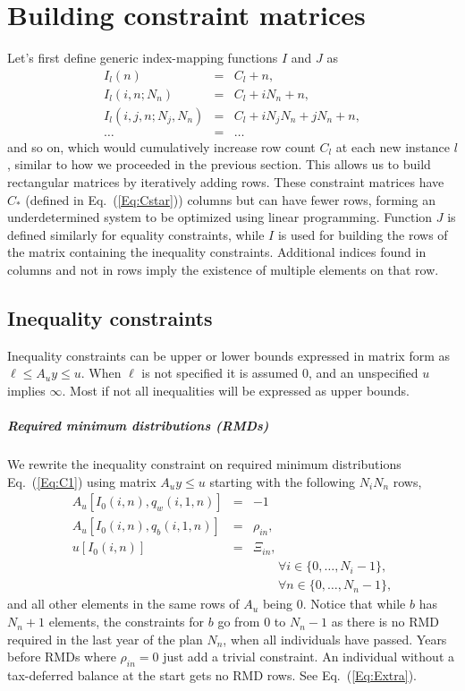 \documentclass[fleqn,12pt]{report}
\begin{document}
\chapter{Building constraint matrices}
\label{Chap:Matrices}
Let's first define generic index-mapping functions $I$ and $J$ as
\begin{eqnarray}
	\label{Eq:Offsets}
	I_l(n) &=& C_l + n, \nonumber \\
	I_l(i, n; N_n) &=& C_l + iN_n + n, \nonumber \\
	I_l(i, j, n; N_j, N_n) &=& C_l + iN_j N_n + jN_n +n, \\
	\ldots &=& \ldots \nonumber
\end{eqnarray}
and so on, which would cumulatively increase row count $C_l$ at each new instance $l$,
similar to how we proceeded in the previous section.
This allows us to build rectangular matrices by iteratively adding rows.
These constraint matrices have $C_*$ (defined in Eq.~(\ref{Eq:Cstar}))
columns but can have fewer rows,
forming an underdetermined system to be optimized using linear programming.
Function $J$ is defined similarly for equality constraints, while $I$ is used
for building the rows of the matrix containing the inequality constraints.
Additional indices found in columns and not in rows imply the existence of multiple elements on that row. 

\section{Inequality constraints}
Inequality constraints can be upper or lower bounds expressed in matrix form as
$\ell \le A_{u}y \le u$. When $\ell$ is not specified it is assumed 0, and
an unspecified $u$ implies $\infty$. Most if not all inequalities will be expressed as upper bounds.

\paragraph*{Required minimum distributions (RMDs)}
We rewrite the inequality constraint on required minimum distributions
Eq.~(\ref{Eq:C1}) using matrix $A_{u}y \le u$ starting with the following $N_iN_n$ rows, 
\begin{eqnarray}
	A_u[I_0(i, n), q_w(i, 1, n)] &=& -1 \nonumber \\
	A_u[I_0(i, n), q_b(i, 1, n)] &=& \rho_{in}, \nonumber \\
	u[I_0(i, n)] &=& \Xi_{in}, \\
	&&\qquad\forall i \in \{0,\ldots, N_i - 1\}, \nonumber\\
	&&\qquad\forall n \in \{0,\ldots, N_n - 1\},\nonumber
\end{eqnarray}
and all other elements in the same rows of $A_u$ being $0$.
Notice that while $b$ has $N_n+1$ elements, the constraints
for $b$ go from $0$ to $N_n-1$ as there is no RMD required in the last year of the plan $N_n$,
when all individuals have passed. Years before RMDs where $\rho_{in} = 0$ just add a trivial constraint.
An individual without a tax-deferred balance at the start gets no RMD rows.
See Eq.~(\ref{Eq:Extra}).
\end{document}
